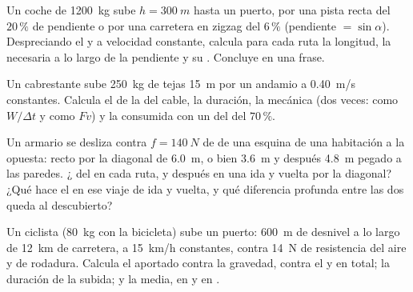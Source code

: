 \begin{exercise}[$\star\star\star$]\label{exo:g11:work-of-force:12}
Un coche de \qty{1200}{kg} sube $h = \qty{300}{m}$ hasta un puerto, por
una pista recta del $20\,\%$ de pendiente o por una carretera en zigzag
del $6\,\%$ (pendiente $= \sin\alpha$). Despreciando el  y a
velocidad constante, calcula para cada ruta la longitud, la 
necesaria a lo largo de la pendiente y su . Concluye en una
frase.
\end{exercise}

\begin{exercise}[$\star\star\star$]\label{exo:g11:work-of-force:13}
Un cabrestante sube \qty{250}{kg} de tejas \qty{15}{m} por un andamio a
\qty{0.40}{m/s} constantes. Calcula el  de la  del cable,
la duración, la  mecánica (dos veces: como $W/\Delta t$ y como
$Fv$) y la  consumida con un  del  del
$70\,\%$.
\end{exercise}

\begin{exercise}[$\star\star\star$]\label{exo:g11:work-of-force:14}
Un armario se desliza contra $f = \qty{140}{N}$ de  de una
esquina de una habitación a la opuesta: recto por la diagonal de
\qty{6.0}{m}, o bien \qty{3.6}{m} y después \qty{4.8}{m} pegado a las
paredes. ¿ del  en cada ruta, y después en una ida y
vuelta por la diagonal? ¿Qué hace el  en ese viaje de ida y vuelta,
y qué diferencia profunda entre las dos  queda al descubierto?
\end{exercise}

\begin{exercise}[$\star\star\star$]\label{exo:g11:work-of-force:15}
Un ciclista (\qty{80}{kg} con la bicicleta) sube un puerto:
\qty{600}{m} de desnivel a lo largo de \qty{12}{km} de carretera, a
\qty{15}{km/h} constantes, contra \qty{14}{N} de resistencia del aire y
de rodadura. Calcula el  aportado contra la gravedad, contra el
 y en total; la duración de la subida; y la  media, en
 y en .
\end{exercise}

